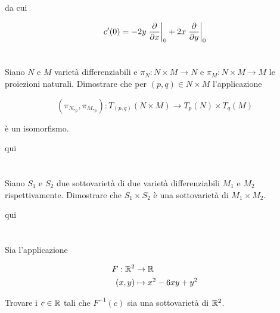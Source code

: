 da cui

\begin{equation}
	c'(0) = -2y \eval{\pdv{x}}_{0} + 2x \eval{\pdv{y}}_{0}
\end{equation}

\tocless\section{}\label{es2-11}

\begin{tcolorbox}
	Siano $ N $ e $ M $ varietà differenziabili e $ \pi_{N} : N \times M \to N $ e $ \pi_{M} : N \times M \to M $ le proiezioni naturali. Dimostrare che per $ (p,q) \in N \times M $ l'applicazione
	
	\begin{equation}
		(\pi_{N_{*p}},\pi_{M_{*p}}) : T_{(p,q)}(N \times M) \to T_{p}(N) \times T_{q}(M)
	\end{equation}
	
	è un isomorfismo.
\end{tcolorbox}

qui




\tocless\section{}\label{es2-12}

\begin{tcolorbox}
	Siano $ S_{1} $ e $ S_{2} $ due sottovarietà di due varietà differenziabili $ M_{1} $ e $ M_{2} $ rispettivamente. Dimostrare che $ S_{1} \times S_{2} $ è una sottovarietà di $ M_{1} \times M_{2} $.
\end{tcolorbox}

qui

\tocless\section{}\label{es2-13}

\begin{tcolorbox}
	Sia l'applicazione
	
	\begin{align}
		\begin{split}
			F : \mathbb{R}^{2} &\to \mathbb{R}\\
			(x,y) &\mapsto x^{2}-6xy+y^{2}
		\end{split}
	\end{align}

	Trovare i $ c \in \mathbb{R} $ tali che $ F^{-1}(c) $ sia una sottovarietà di $ \mathbb{R}^{2} $.
\end{tcolorbox}

